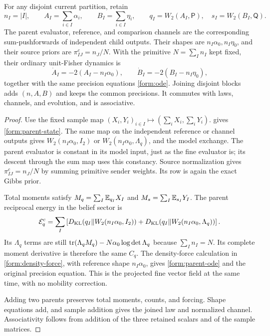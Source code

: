 For any disjoint current partition, retain
\begin{equation}
 n_I=|I|,\qquad A_I=\sum_{i\in I}\alpha_i,\qquad
 B_I=\sum_{i\in I}\eta_i,\qquad
 q_I=W_2(A_I,\mathsf P),\quad s_I=W_2(B_I,\mathsf Q).
 \label{form:parent-state}
\end{equation}
The parent evaluator, reference, and comparison channels are the corresponding
sum-pushforwards of independent child outputs. Their shapes are
$n_I\alpha_0,n_I\eta_0$, and their source priors are
$\pi^c_{IJ}=n_J/N$. With the primitive $N=\sum_I n_I$ kept fixed, their
ordinary unit-Fisher dynamics is
\begin{equation}
 \dot A_I=-2(A_I-n_I\alpha_0),\qquad
 \dot B_I=-2(B_I-n_I\eta_0),
 \label{form:parent-ode}
\end{equation}
together with the same precision equations \cref{form:ode}. Joining disjoint
blocks adds $(n,A,B)$ and keeps the common precisions. It commutes with laws,
channels, and evolution, and is associative.

\begin{proof}
Use the fixed sample map
$(X_i,Y_i)_{i\in I}\mapsto(\sum_iX_i,\sum_iY_i)$.
 gives \cref{form:parent-state}. The same map on the
independent reference or channel outputs gives
$W_2(n_I\alpha_0,I_2)$ or $W_2(n_I\alpha_0,\Lambda_q)$, and the model exchange.
The parent evaluator is constant in its model input, just as the fine
evaluator is; its descent through the sum map uses this constancy. Source normalization gives $\pi^c_{IJ}=n_J/N$ by summing
primitive sender weights. Its row is again the exact Gibbs prior.

Total moments satisfy
$M_q=\sum_I\mathbb E_{q_I}X_I$ and $M_s=\sum_I\mathbb E_{s_I}Y_I$.
The parent reciprocal energy in the belief sector is
\begin{equation}
 \mathcal E_q^c=\sum_I\left[
 D_{\mathrm{KL}}(q_I\Vert W_2(n_I\alpha_0,I_2))
 +D_{\mathrm{KL}}(q_I\Vert W_2(n_I\alpha_0,\Lambda_q))\right].
\end{equation}
Its $\Lambda_q$ terms are still
$\operatorname{tr}(\Lambda_qM_q)-N\alpha_0\log\det\Lambda_q$ because $\sum_I n_I=N$.
Its complete moment derivative is therefore the same $C_q$. The density-force
calculation in \cref{form:density-force}, with reference shape $n_I\alpha_0$,
gives \cref{form:parent-ode} and the original precision equation. This is the
projected fine vector field at the same time, with no mobility correction.

Adding two parents preserves total moments, counts, and forcing. Shape
equations add, and sample addition gives the joined law and normalized
channel. Associativity follows from addition of the three retained scalars
and of the sample matrices.
\end{proof}

